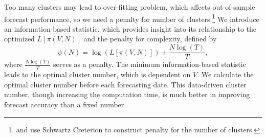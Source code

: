 \documentclass[preprint,12pt,authoryear]{elsarticle}
\begin{document}
	
	

Too many clusters may lead to over-fitting problem, which affects out-of-sample forecast performance, so we need a penalty for number of clusters.\footnote{\cite{Yao1988} and \cite{Kuehn2001} use Schwartz Creterion to construct penalty for the number of clusters.} We introduce an
information-based statistic, which provides insight into its
relationship to the optimized $L\left[\pi\left(V,N\right)\right]$ and the penalty for
complexity, defined by
 \begin{equation}\label{xiaopei1}\psi(N) = \log(L\left[\pi\left(V,N\right)\right]) + \frac{N\log(T)}{T}, \end{equation}
 where $\frac{N\log(T)}{T}$ serves as a penalty. The minimum information-based statistic leads to the optimal cluster number, which is dependent on $V$. {We calculate the optimal cluster number before each forecasting date. This data-driven cluster number, though increasing the computation time, is much better in improving forecast accuracy than a fixed number}.
\end{document}
